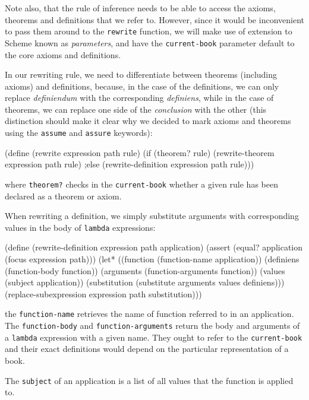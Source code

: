 Note also, that the rule of inference needs to be able to access
the axioms, theorems and definitions that we refer to. However,
since it would be inconvenient to pass them around to the
\texttt{rewrite} function, we will make use of extension to Scheme
known as \textit{parameters}\cite{SRFI-39}, and have
the \texttt{current-book} parameter default to the core axioms
and definitions.

In our rewriting rule, we need to differentiate between theorems
(including axioms) and definitions, because, in the case of the
definitions, we can only replace \textit{definiendum} with
the corresponding \textit{definiens}, while in the case of theorems,
we can replace one side of the \textit{conclusion} with the other
(this distinction should make it clear why we decided to mark
axioms and theorems using the \texttt{assume} and \texttt{assure}
keywords):

\begin{Snippet}
  (define (rewrite expression path rule)
    (if (theorem? rule)
      (rewrite-theorem expression path rule)
    ;else
      (rewrite-definition expression path rule)))
\end{Snippet}

where \texttt{theorem?} checks in the \texttt{current-book}
whether a given rule has been declared as a theorem or axiom.

When rewriting a definition, we simply substitute
arguments with corresponding values in the body of
\texttt{lambda} expressions:

\begin{Snippet}
  (define (rewrite-definition expression path application)
    (assert (equal? application (focus expression path)))
    (let* ((function (function-name application))
           (definiens (function-body function))
           (arguments (function-arguments function))
           (values (subject application))
           (substitution (substitute arguments values definiens)))
      (replace-subexpression expression path substitution)))
\end{Snippet}

the \texttt{function-name} retrieves the name of function referred
to in an application. The \texttt{function-body}
and \texttt{function-arguments} return the body and arguments
of a \texttt{lambda} expression with a given name. They ought to refer
to the \texttt{current-book} and their exact definitions would depend on
the particular representation of a book.

The \texttt{subject} of an application is a list of all values
that the function is applied to.

